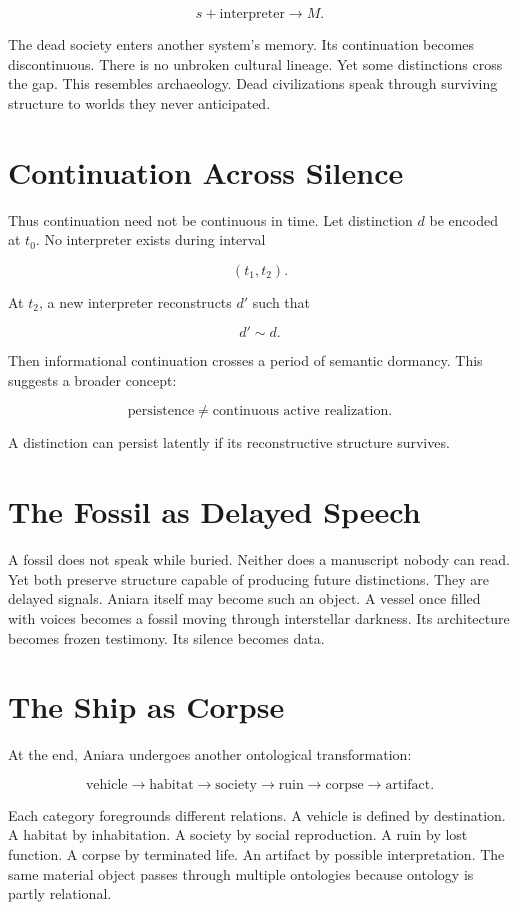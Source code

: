 \documentclass[11pt,oneside]{book}
\theoremstyle{definition}
\theoremstyle{remark}
\begin{document}
\[
s+\text{interpreter} \rightarrow M.
\]

The dead society enters another system's memory. Its continuation becomes discontinuous. There is no
unbroken cultural lineage. Yet some distinctions cross the gap. This resembles archaeology. Dead
civilizations speak through surviving structure to worlds they never anticipated.

\section{Continuation Across Silence}

Thus continuation need not be continuous in time. Let distinction \(d\) be encoded at \(t_0\). No
interpreter exists during interval

\[
(t_1,t_2).
\]

At \(t_2\), a new interpreter reconstructs \(d'\) such that

\[
d'\sim d.
\]

Then informational continuation crosses a period of semantic dormancy. This suggests a broader
concept:

\[
\text{persistence} \neq \text{continuous active realization}.
\]

A distinction can persist latently if its reconstructive structure survives.

\section{The Fossil as Delayed Speech}

A fossil does not speak while buried. Neither does a manuscript nobody can read. Yet both preserve
structure capable of producing future distinctions. They are delayed signals. Aniara itself may
become such an object. A vessel once filled with voices becomes a fossil moving through interstellar
darkness. Its architecture becomes frozen testimony. Its silence becomes data.

\section{The Ship as Corpse}

At the end, Aniara undergoes another ontological transformation:

\[
\text{vehicle} \rightarrow \text{habitat} \rightarrow \text{society} \rightarrow \text{ruin} \rightarrow \text{corpse} \rightarrow \text{artifact}.
\]

Each category foregrounds different relations. A vehicle is defined by destination. A habitat by
inhabitation. A society by social reproduction. A ruin by lost function. A corpse by terminated
life. An artifact by possible interpretation. The same material object passes through multiple
ontologies because ontology is partly relational.
\end{document}
